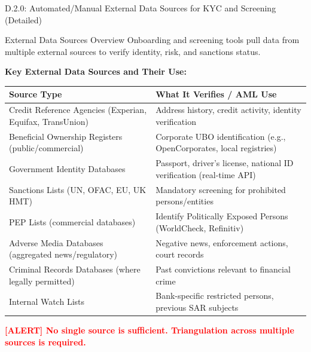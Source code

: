 \documentclass[11pt,a4paper]{beamer}
\newcommand{\redflag}[1]{\textcolor{red}{\textbf{[ALERT] #1}}}
\begin{document}
\begin{frame}{D.2.0: Automated/Manual External Data Sources for KYC and Screening (Detailed)}
	\begin{block}{External Data Sources Overview}
		Onboarding and screening tools pull data from multiple external sources to verify identity, risk, and sanctions status.
	\end{block}
	\textbf{Key External Data Sources and Their Use:}
	\begin{tabular}{p{}|p{}}
		\hline
		\rowcolor{lightgray}
		\textbf{Source Type} & \textbf{What It Verifies / AML Use} \\
		\hline
		Credit Reference Agencies (Experian, Equifax, TransUnion) & Address history, credit activity, identity verification \\
		\hline
		Beneficial Ownership Registers (public/commercial) & Corporate UBO identification (e.g., OpenCorporates, local registries) \\
		\hline
		Government Identity Databases & Passport, driver's license, national ID verification (real-time API) \\
		\hline
		Sanctions Lists (UN, OFAC, EU, UK HMT) & Mandatory screening for prohibited persons/entities \\
		\hline
		PEP Lists (commercial databases) & Identify Politically Exposed Persons (WorldCheck, Refinitiv) \\
		\hline
		Adverse Media Databases (aggregated news/regulatory) & Negative news, enforcement actions, court records \\
		\hline
		Criminal Records Databases (where legally permitted) & Past convictions relevant to financial crime \\
		\hline
		Internal Watch Lists & Bank-specific restricted persons, previous SAR subjects \\
		\hline
	\end{tabular}
	\redflag{No single source is sufficient. Triangulation across multiple sources is required.}
\end{frame}
\end{document}
